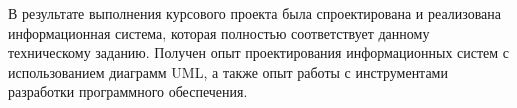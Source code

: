 
В результате выполнения курсового проекта была спроектирована и 
реализована информационная система, которая полностью соответствует 
данному техническому заданию.  Получен опыт проектирования 
информационных систем с использованием диаграмм UML, а также опыт работы 
с инструментами разработки программного обеспечения. 
